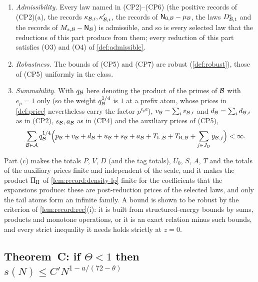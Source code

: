 \begin{definition}\label{def:cp8}
\leavevmode
\begin{enumerate}[label=(\alph*)]
\item\emph{Admissibility.} Every law named in (CP2)--(CP6) (the positive
 records of (CP2)(a), the records $\kappa_{\mathcal B,i},\kappa'_{\mathcal B,i}$, the
 records of $\mathsf N_{0,\mathcal B}-\mu_{\mathcal B}$, the laws $D^\epsilon_{\mathcal B,t}$ and the
 records of $M_{s,\mathcal B}-\mathsf N_{\mathcal B}$) is admissible, and so is every selected
 law that the reductions of this part produce from them; every reduction of
 this part satisfies (O3) and (O4) of \cref{def:admissible}.
\item\emph{Robustness.} The bounds of (CP5) and (CP7) are robust
 (\cref{def:robust}), those of (CP5) uniformly in the class.
\item\emph{Summability.} With $q_{\mathcal B}$ here denoting the
 product of the primes of $\mathcal B$ with $e_p=1$ only (so the weight
 $q_{\mathcal B}^{1/4}$ is $1$ at a prefix atom, whose prices in
 \cref{def:price} nevertheless carry the factor $p^{e_pa}$),
 $v_\mathcal B=\sum_iv_{\mathcal B,i}$ and $d_\mathcal B=\sum_id_{\mathcal B,i}$
 as in (CP2), $s_{\mathcal B},a_{\mathcal B}$ as in (CP4) and the auxiliary prices of
 (CP5),
 \[
  \sum_{\mathcal B\in\mathcal A}q_{\mathcal B}^{1/4}\Bigl(p_{\mathcal B}+v_{\mathcal B}+d_{\mathcal B}
  +u_{\mathcal B}+s_{\mathcal B}+a_{\mathcal B}+T_{{\rm L},\mathcal B}+T_{{\rm R},\mathcal B}
  +\sum_{j\in J_\mathcal B}y_{\mathcal B,j}\Bigr)<\infty .
 \]
\end{enumerate}
\end{definition}

Part (c) makes the totals $P$, $V$, $D$ (and the tag totals), $U_0$, $S$,
$A$, $T$ and the totals of the auxiliary prices finite and independent of the
scale, and it makes the product $\Pi_{\rm H}$ of \cref{lem:record:density-lp}
finite for the coefficients that the expansions produce: these are
post-reduction prices of the selected laws, and only the tail atoms form an
infinite family. A bound is shown to be robust by the criterion of
\cref{lem:record:rec}(i): it is built from structured-energy bounds by sums,
products and monotone operations, or it is an exact relation minus such
bounds, and every strict inequality it needs holds strictly at $z=0$.

\subsection{Theorem~C: if \texorpdfstring{$\Theta<1$}{Theta<1} then \texorpdfstring{$s(N)\le C'N^{1-a/(72-\theta)}$}{s(N) <= C' N\textasciicircum (1-a/(72-theta))}}\label{subsec:cp:theorem}

